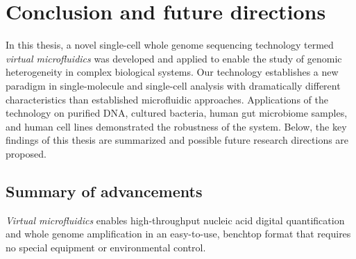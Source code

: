 \chapter{Conclusion and future directions}
In this thesis, a novel single-cell whole genome sequencing technology termed \textit{virtual microfluidics} was developed and applied to enable the study of genomic heterogeneity in complex biological systems. Our technology establishes a new paradigm in single-molecule and single-cell analysis with dramatically different characteristics than established microfluidic approaches. Applications of the technology on purified DNA, cultured bacteria, human gut microbiome samples, and human cell lines demonstrated the robustness of the system. Below, the key findings of this thesis are summarized and possible future research directions are proposed.

\section{Summary of advancements}
\textit{Virtual microfluidics} enables high-throughput nucleic acid digital quantification and whole genome amplification in an easy-to-use, benchtop format that requires no special equipment or environmental control. 


